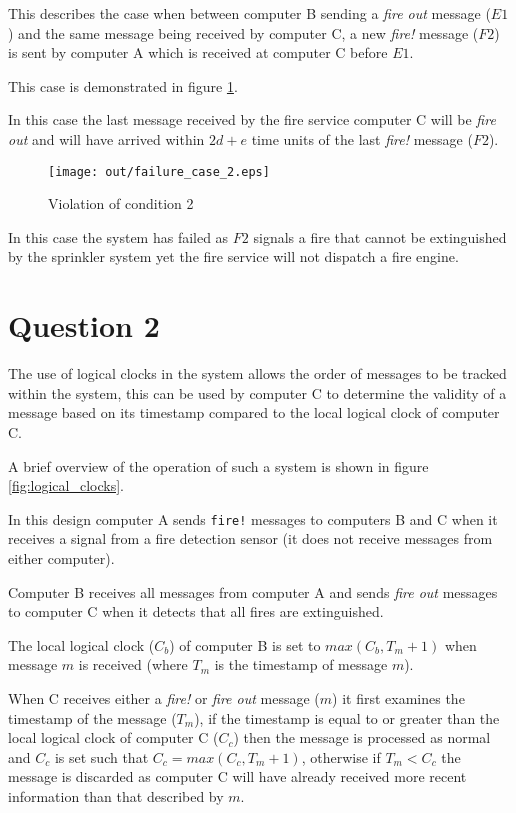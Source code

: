 \documentclass[twocolumn]{article}
\begin{document}
This describes the case when between computer B sending a \textit{fire out}
message ($E1$) and the same message being received by computer C, a new
\textit{fire!} message ($F2$) is sent by computer A which is received at
computer C before $E1$.

This case is demonstrated in figure \ref{fig:failure_case_2}.

In this case the last message received by the fire service computer C will be
\textit{fire out} and will have arrived within $2d + e$ time units of the last
\textit{fire!} message ($F2$).

\begin{figure}[h!]
  \centering
  \texttt{[image: out/failure\_case\_2.eps]}
  \caption{Violation of condition 2}
  \label{fig:failure_case_2}
\end{figure}

In this case the system has failed as $F2$ signals a fire that cannot be
extinguished by the sprinkler system yet the fire service will not dispatch a
fire engine.

\section{Question 2}

The use of logical clocks in the system allows the order of messages to be
tracked within the system, this can be used by computer C to determine the
validity of a message based on its timestamp compared to the local logical
clock of computer C.

A brief overview of the operation of such a system is shown in figure
\ref{fig:logical_clocks}.

In this design computer A sends \texttt{fire!} messages to computers B and C
when it receives a signal from a fire detection sensor (it does not receive
messages from either computer).

Computer B receives all messages from computer A and sends \textit{fire out}
messages to computer C when it detects that all fires are extinguished.

The local logical clock ($C_{b}$) of computer B is set to $max(C_{b}, T_{m} +
1)$ when message $m$ is received (where $T_{m}$ is the timestamp of message
$m$).

When C receives either a \textit{fire!} or \textit{fire out} message ($m$) it
first examines the timestamp of the message ($T_{m}$), if the timestamp is equal
to or greater than the local logical clock of computer C ($C_{c}$) then the
message is processed as normal and $C_{c}$ is set such that $C_{c} = max(C_{c},
T_{m} + 1)$, otherwise if $T_{m} < C_{c}$ the message is discarded as computer C
will have already received more recent information than that described by $m$.
\end{document}
